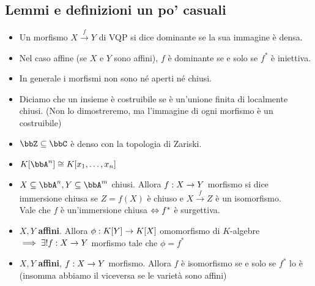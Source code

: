 \documentclass[a4paper,NoNotes,GeneralMath]{stdmdoc}
\newcommand{\xrar}{\xrightarrow}
\begin{document}
	\subsection*{Lemmi e definizioni un po' casuali}
	\begin{itemize}
		\item Un morfismo $X \xrar{f} Y$ di VQP si dice dominante se la sua immagine è densa.
		\item Nel caso affine (se $X$ e $Y$ sono affini), $f$ è dominante se e solo se $f^{*}$ è iniettiva.
		\item In generale i morfismi non sono né aperti né chiusi.
		\item Diciamo che un insieme è costruibile se è un'unione finita di localmente chiusi. (Non lo dimostreremo, ma l'immagine di ogni morfismo è un costruibile)
		\item $\bbZ \subseteq \bbC$ è denso con la topologia di Zariski.
		\item $K[\bbA^n] \cong K[x_1, \ldots, x_n]$
		\item $X \subseteq \bbA^n, Y \subseteq \bbA^m$ chiusi. Allora $f: X \rightarrow Y$ morfismo si dice immersione chiusa se $Z = f(X)$ è chiuso e $X \xrar{f} Z$ è un isomorfismo. \\
			Vale che $f$ è un'immersione chiusa $\Leftrightarrow f^{*}$ è surgettiva.
		\item $X, Y$ {\bf affini}. Allora $\phi: K[Y] \rightarrow K[X]$ omomorfismo di $K$-algebre $\implies \exists ! f: X \rightarrow Y$ morfismo tale che $\phi = f^*$
		\item $X, Y$ {\bf affini}, $f: X \rightarrow Y$ morfismo. Allora $f$ è isomorfismo se e solo se $f^*$ lo è (insomma abbiamo il viceversa se le varietà sono affini)
	\end{itemize}
	
\end{document}

